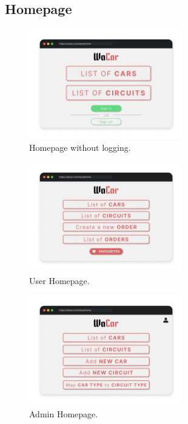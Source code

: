 \subsection{Homepage}

\begin{figure}[h]
    \centering
    \includegraphics[width=0.6\textwidth]{mockup/NoLogHome.png}
    \caption{Homepage without logging.}
    \label{fig:nologhome}
\end{figure}

\begin{figure}[h]
    \centering
    \includegraphics[width=0.6\textwidth]{mockup/UserHome.png}
    \caption{User Homepage.}
    \label{fig:usehome}
\end{figure}

\begin{figure}[h]
    \centering
    \includegraphics[width=0.6\textwidth]{mockup/AdminHome.png}
    \caption{Admin Homepage.}
    \label{fig:adminhome}
\end{figure}

